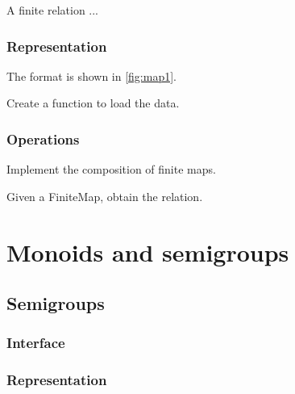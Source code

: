 A finite relation  ...


\subsection*{Representation}

The format is shown in \cref{fig:map1}.


\begin{exercise}[Representation]
  Create a function to load the data.


%

\end{exercise}

\subsection{Operations}


\begin{exercise}[Composition]
  Implement the composition of finite maps.


%

\end{exercise}


\begin{exercise}
  Given a FiniteMap, obtain the relation.


%

\end{exercise}


\chapter{Monoids and semigroups}


\section{Semigroups}

\subsection*{Interface}



\subsection*{Representation}

